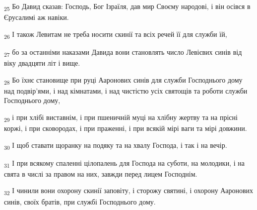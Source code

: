 \begin{tcolorbox}
\textsubscript{25} Бо Давид сказав: Господь, Бог Ізраїля, дав мир Своєму народові, і він осівся в Єрусалимі аж навіки.
\end{tcolorbox}
\begin{tcolorbox}
\textsubscript{26} І також Левитам не треба носити скинії та всіх речей її для служби їй,
\end{tcolorbox}
\begin{tcolorbox}
\textsubscript{27} бо за останніми наказами Давида вони становлять число Левієвих синів від віку двадцяти літ і вище.
\end{tcolorbox}
\begin{tcolorbox}
\textsubscript{28} Бо їхнє становище при руці Ааронових синів для служби Господнього дому над подвір'ями, і над кімнатами, і над чистістю усіх святощів та роботи служби Господнього дому,
\end{tcolorbox}
\begin{tcolorbox}
\textsubscript{29} і при хлібі виставнім, і при пшеничній муці на хлібну жертву та на прісні коржі, і при сковородах, і при праженні, і при всякій мірі ваги та мірі довжини.
\end{tcolorbox}
\begin{tcolorbox}
\textsubscript{30} І щоб ставати щоранку на подяку та на хвалу Господа, і так і на вечір.
\end{tcolorbox}
\begin{tcolorbox}
\textsubscript{31} І при всякому спаленні цілопалень для Господа на суботи, на молодики, і на свята в числі за правом на них, завжди перед лицем Господнім.
\end{tcolorbox}
\begin{tcolorbox}
\textsubscript{32} І чинили вони охорону скинії заповіту, і сторожу святині, і охорону Ааронових синів, своїх братів, при службі Господнього дому.
\end{tcolorbox}
